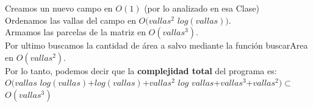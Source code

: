 \begin{itemize}
\begin{itemize}
\indent Creamos un nuevo campo en $O(1)$ (por lo analizado en esa Clase)\\
\indent Ordenamos las vallas del campo en  $O(vallas^2$ $log(vallas))$.\\
\indent Armamos las parcelas de la matriz en $O(vallas^3)$.\\
\indent Por ultimo buscamos la cantidad de área a salvo mediante la función
buscarArea en $O(vallas^2)$.\\

\indent Por lo tanto, podemos decir que la \textbf{complejidad total} del programa es:\\
$O(vallas$ $log(vallas)$+$log(vallas)$+$vallas^2$ $log$ $vallas$+$vallas^3$+$vallas^2) \subset$ \textbf{$O(vallas^3)$}

\end{itemize}

\end{itemize}






